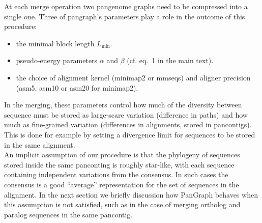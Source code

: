 \documentclass[aps,rmp,reprint,superscriptaddress,notitlepage,10pt,onecolumn]{revtex4-1}
\newcommand{\Lthr}{L_{\min}}
\begin{document}
At each merge operation two pangenome graphs need to be compressed into a single one. Three of pangraph's parameters play a role in the outcome of this procedure:
\begin{itemize}
    \item the minimal block length $\Lthr$.
    \item pseudo-energy parameters $\alpha$ and $\beta$ (cf. eq.~1 in the main text).
    \item the choice of alignment kernel (minimap2 or mmseqs) and aligner precision (asm5, asm10 or asm20 for minimap2).
\end{itemize}
In the merging, these parameters control how much of the diversity between sequence must be stored as large-scare variation (difference in paths) and how much as fine-grained variation (differences in alignments, stored in pancontigs). This is done for example by setting a divergence limit for sequences to be stored in the same alignment.\\
An implicit assumption of our procedure is that the phylogeny of sequences stored inside the same panconting is roughly star-like, with each sequence containing independent variations from the consensus. In such cases the consensus is a good ``average'' representation for the set of sequences in the alignment.
In the next section we briefly discussion how PanGraph behaves when this assumption is not satisfied, such as in the case of merging ortholog and paralog sequences in the same pancontig.\\
\end{document}
